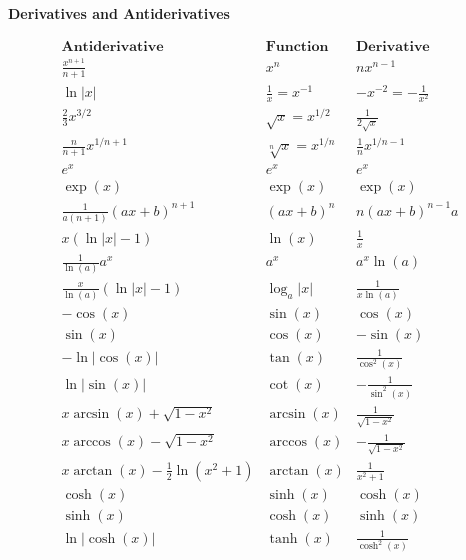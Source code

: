 \begin{center}
\begin{minipage}{0.42\linewidth}
\centering
\label{tab:derivatives}
{\bfseries\sffamily\color{subText}\fontsize{8.8pt}{10.5pt}\selectfont Derivatives and Antiderivatives}\\[3pt]
\renewcommand{\arraystretch}{0.75}
\begin{tcolorbox}[
  width=\linewidth,
  colframe=secRule, colback=blue!3,
  boxrule=0.55pt, leftrule=2pt, arc=2pt,
  left=2pt, right=2pt, top=1pt, bottom=1pt, boxsep=1pt,
  before skip=2pt, after skip=2pt
]
\[
\begin{array}{lll}
\textbf{Antiderivative} & \textbf{Function} & \textbf{Derivative}\\
\hline
\frac{x^{n+1}}{n+1} & x^n & nx^{n-1}\\[0.01cm]
\ln|x| & \frac1x=x^{-1} & -x^{-2}=-\frac1{x^2}\\[0.01cm]
\frac23 x^{3/2} & \sqrt{x}=x^{1/2} & \frac1{2\sqrt{x}}\\[0.01cm]
\frac{n}{n+1}x^{1/n+1} & \sqrt[n]{x}=x^{1/n} & \frac1n x^{1/n-1}\\ [0.1cm]
\hline
e^x & e^x & e^x\\
\exp(x) & \exp(x) & \exp(x)\\
\frac{1}{a(n+1)}(ax+b)^{n+1} & (ax+b)^n & n(ax+b)^{n-1}a\\
x(\ln|x|-1) & \ln(x) & \frac1x\\
\frac1{\ln(a)}a^x & a^x & a^x\ln(a)\\
\frac{x}{\ln(a)}(\ln|x|-1) & \log_a|x| & \frac1{x\ln(a)}\\ [0.1cm]
\hline
-\cos(x) & \sin(x) & \cos(x)\\
\sin(x) & \cos(x) & -\sin(x)\\
-\ln|\cos(x)| & \tan(x) & \frac1{\cos^2(x)}\\
\ln|\sin(x)| & \cot(x) & -\frac1{\sin^2(x)}\\
x\arcsin(x)+\sqrt{1-x^2} & \arcsin(x) & \frac1{\sqrt{1-x^2}}\\
x\arccos(x)-\sqrt{1-x^2} & \arccos(x) & -\frac1{\sqrt{1-x^2}}\\
x\arctan(x)-\frac12\ln(x^2+1) & \arctan(x) & \frac1{x^2+1}\\
\cosh(x) & \sinh(x) & \cosh(x)\\
\sinh(x) & \cosh(x) & \sinh(x)\\
\ln|\cosh(x)| & \tanh(x) & \frac1{\cosh^2(x)}\\
\end{array}
\]
\end{tcolorbox}
\end{minipage}
\end{center}

